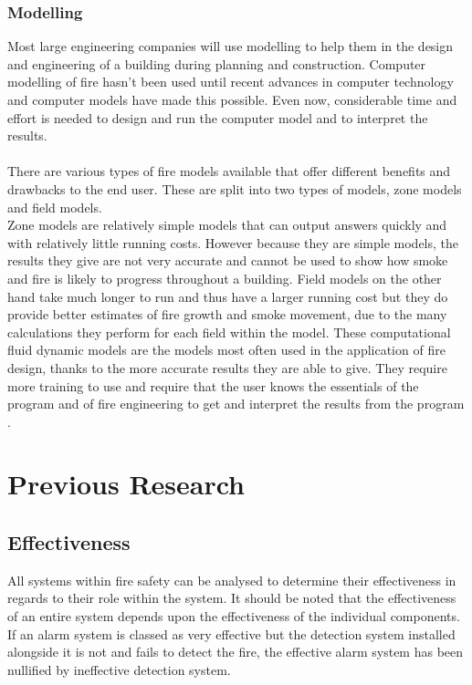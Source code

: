\documentclass[table,a4paper,oneside]{book}
\begin{document}
\subsubsection{Modelling}
Most large engineering companies will use modelling to help them in the design and engineering of a building during planning and construction. Computer modelling of fire hasn't been used until recent advances in computer technology and computer models have made this possible. Even now, considerable time and effort is needed to design and run the computer model and to interpret the results.
\\
\\
There are various types of fire models available that offer different benefits and drawbacks to the end user. These are split into two types of models, zone models and field models.
\\
Zone models are relatively simple models that can output answers quickly and with relatively little running costs.  However because they are simple models, the results they give are not very accurate and cannot be used to show how smoke and fire is likely to progress throughout a building. Field models on the other hand take much longer to run and thus have a larger running cost but they do provide better estimates of fire growth and smoke movement, due to the many calculations they perform for each field within the model. These computational fluid dynamic models are the models most often used in the application of fire design, thanks to the more accurate results they are able to give. They require more training to use and require that the user knows the essentials of the program and of fire engineering to get and interpret the results from the program \citep{Cox1994123}.
\section{Previous Research}
\subsection{Effectiveness}
All systems within fire safety can be analysed to determine their effectiveness in regards to their role within the system. It should be noted that the effectiveness of an entire system depends upon the effectiveness of the individual components. If an alarm system is classed as very effective but the detection system installed alongside it is not and fails to detect the fire, the effective alarm system has been nullified by ineffective detection system.
\end{document}
